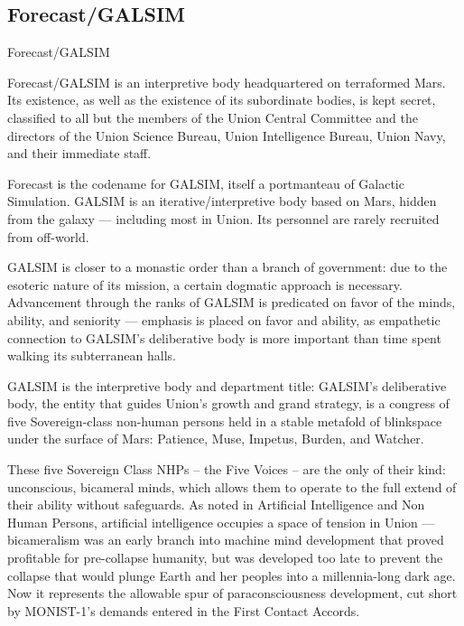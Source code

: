 \subsection{Forecast/GALSIM}
Forecast/GALSIM   

Forecast/GALSIM is an interpretive body headquartered on terraformed Mars. Its existence, as  
well as the existence of its subordinate bodies, is kept secret, classified to all but the members of  
the Union Central Committee and the directors of the Union Science Bureau, Union Intelligence  
Bureau, Union Navy, and their immediate staff. 
 

Forecast is the codename for GALSIM, itself a portmanteau of Galactic Simulation. GALSIM is an  
iterative/interpretive body based on Mars, hidden from the galaxy — including most in Union. Its  
personnel are rarely recruited from off-world. 
 

GALSIM is closer to a monastic order than a branch of government: due to the esoteric nature of  
its mission, a certain dogmatic approach is necessary. Advancement through the ranks of  
GALSIM is predicated on favor of the minds, ability, and seniority — emphasis is placed on favor  
and ability, as empathetic connection to GALSIM’s deliberative body is more important than time  
spent walking its subterranean halls. 
 

GALSIM is the interpretive body and department title: GALSIM’s deliberative body, the entity that  
guides Union’s growth and grand strategy, is a congress of five Sovereign-class non-human  
persons held in a stable metafold of blinkspace under the surface of Mars: Patience, Muse,  
Impetus, Burden, and Watcher.
 

These five Sovereign Class NHPs -- the Five Voices -- are the only of their kind: unconscious,  
bicameral minds, which allows them to operate to the full extend of their ability without  
safeguards. As noted in Artificial Intelligence and Non Human Persons, artificial intelligence  
occupies a space of tension in Union — bicameralism was an early branch into machine mind  
development that proved profitable for pre-collapse humanity, but was developed too late to  
prevent the collapse that would plunge Earth and her peoples into a millennia-long dark age.  
Now it represents the allowable spur of paraconsciousness development, cut short by  
MONIST-1’s demands entered in the First Contact Accords. 
 

                                                                                                         


